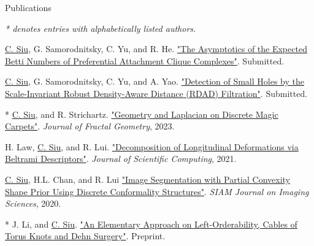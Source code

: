\documentclass{resume} %
\begin{document}

\begin{rSection}{Publications}

\emph{* denotes entries with alphabetically listed authors.}

\underline{C. Siu}, G. Samorodnitsky, C. Yu, and R. He. \href{https://arxiv.org/abs/2305.11259}{"The Asymptotics of the Expected Betti Numbers of Preferential Attachment Clique Complexes"}. Submitted.

\underline{C. Siu}, G. Samorodnitsky, C. Yu, and A. Yao. \href{https://arxiv.org/abs/2204.07821}{"Detection of Small Holes by the Scale-Invariant Robust Density-Aware Distance (RDAD) Filtration"}. Submitted.

* \underline{C. Siu}, and R. Strichartz. \href{https://ems.press/journals/jfg/articles/10964400}{"Geometry and Laplacian on Discrete Magic Carpets"}. \emph{Journal of Fractal Geometry}, 2023.

H. Law, \underline{C. Siu}, and R. Lui. \href{https://doi.org/10.1007/s10915-021-01569-x}{"Decomposition of Longitudinal Deformations via Beltrami Descriptors"}. \emph{Journal of Scientific Computing}, 2021.

\underline{C. Siu}, H.L. Chan, and R. Lui \href{https://doi.org/10.1137/19M129718X}{"Image Segmentation with Partial Convexity Shape Prior Using Discrete Conformality Structures"}. \emph{SIAM Journal on Imaging Sciences}, 2020.

* J. Li, and \underline{C. Siu}. \href{https://arxiv.org/abs/1610.00898}{"An Elementary Approach on Left-Orderability, Cables of Torus Knots and Dehn Surgery"}. Preprint.

\end{rSection}
\end{document}
